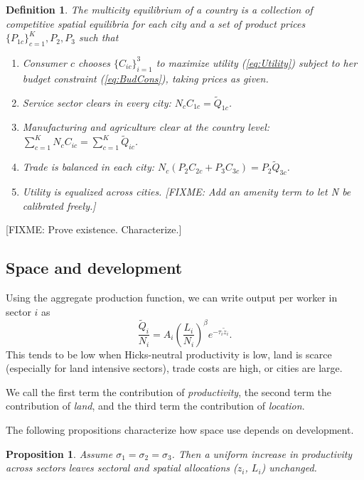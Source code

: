 \documentclass[12pt]{article}
\newtheorem{definition}{Definition}
\newtheorem{proposition}{Proposition}
\begin{document}
\begin{definition}
The multicity equilibrium of a country is a collection of competitive spatial equilibria for each city and a set of product prices $\{P_{1c}\}_{c=1}^K, P_2, P_3$ such that
\begin{enumerate}
    \item Consumer $c$ chooses $\{C_{ic}\}_{i=1}^3$ to maximize utility (\ref{eq:Utility}) subject to her budget constraint (\ref{eq:BudCons}), taking prices as given.
    \item Service sector clears in every city: $N_c C_{1c}=\tilde Q_{1c}$.
    \item Manufacturing and agriculture clear at the country level: $\sum_{c=1}^K N_c C_{ic}=\sum_{c=1}^K\tilde Q_{ic}$.
    \item Trade is balanced in each city: $N_c(P_2C_{2c} + P_3 C_{3c}) = P_2 \tilde Q_{3c}$.
    \item Utility is equalized across cities. 
[FIXME: Add an amenity term to let N be calibrated freely.]
\end{enumerate}
\end{definition}

[FIXME: Prove existence. Characterize.]



\subsection{Space and development}
Using the aggregate production function, we can write output per worker in sector $i$ as
\begin{equation}\label{eq:output_per_worker}
\frac{\tilde Q_i}{N_i} = 
A_i
 \left(
 \frac{L_i}
 {N_i}\right)^{\beta}e^{-\tau_i\tilde z_i}.
\end{equation}
This tends to be low when Hicks-neutral productivity is low, land is scarce (especially for land intensive sectors), trade costs are high, or cities are large.

We call the first term the contribution of \emph{productivity}, the second term the contribution of \emph{land}, and the third term the contribution of \emph{location}. 

The following propositions characterize how space use depends on development.
\begin{proposition}\label{prop:balanced_growth}
Assume $\sigma_1=\sigma_2=\sigma_3$. Then a uniform increase in productivity across sectors leaves sectoral and spatial allocations ($z_i$, $L_i$) unchanged.
\end{proposition}
\end{document}
